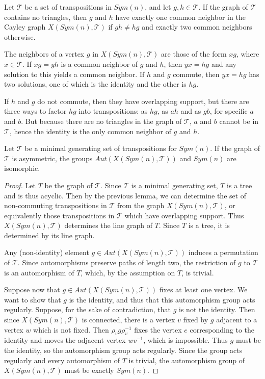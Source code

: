 \begin{lemma}
	Let $\mathcal{T}$ be a set of transpositions in $Sym(n)$, and let $g,h\in \mathcal{T}$.  If the graph of $\mathcal{T}$ contains no triangles, then $g$ and $h$ have exactly one common neighbor in the Cayley graph $X(Sym(n),\mathcal{T})$ if $gh\neq hg$ and exactly two common neighbors otherwise.
\end{lemma}
\begin{lemma}
	The neighbors of a vertex $g$ in $X(Sym(n),\mathcal{T})$ are those of the form $xg$, where $x\in \mathcal{T}$.  If $xg=yh$ is a common neighbor of $g$ and $h$, then $yx=hg$ and any solution to this yields a common neighbor.  If $h$ and $g$ commute, then $yx=hg$ has two solutions, one of which is the identity and the other is $hg$.
	
	If $h$ and $g$ do not commute, then they have overlapping support, but there are three ways to factor $hg$ into transpositions: as $hg$, as $ah$ and as $gb$, for specific $a$ and $b$.  But because there are no triangles in the graph of $\mathcal{T}$, $a$ and $b$ cannot be in $\mathcal{T}$, hence the identity is the only common neighbor of $g$ and $h$.
\end{lemma}



\begin{theorem}
	Let $\mathcal{T}$ be a minimal generating set of transpositions for $Sym(n)$.  If the graph of $\mathcal{T}$ is asymmetric, the groups $Aut(X(Sym(n),\mathcal{T}))$ and  $Sym(n)$ are isomorphic.
\end{theorem}

\begin{proof}
	Let $T$ be the graph of $\mathcal{T}$.  Since $\mathcal{T}$ is a minimal generating set, $T$ is a tree and is thus acyclic.  Then by the previous lemma, we can determine the set of non-commuting transpositions in $\mathcal{T}$ from the graph $X(Sym(n),\mathcal{T})$, or equivalently those transpositions in $\mathcal{T}$ which have overlapping support.  Thus $X(Sym(n),\mathcal{T})$ determines the line graph of $T$.  Since $T$ is a tree, it is determined by its line graph.
	
	Any (non-identity) element $g\in Aut(X(Sym(n),\mathcal{T}))$ induces a permutation of $\mathcal{T}$.  Since automorphisms preserve paths of length two, the restriction of $g$ to $\mathcal{T}$ is an automorphism of $T$, which, by the assumption on $T$, is trivial.
	
	Suppose now that $g\in Aut(X(Sym(n),\mathcal{T}))$ fixes at least one vertex.  We want to show that $g$ is the identity, and thus that this automorphism group acts regularly.  Suppose, for the sake of contradiction, that $g$ is not the identity.  Then since $X(Sym(n),\mathcal{T})$ is connected, there is a vertex $v$ fixed by $g$ adjacent to a vertex $w$ which is not fixed.  Then $\rho_vg\rho_v^{-1}$ fixes the vertex $e$ corresponding to the identity and moves the adjacent vertex $wv^{-1}$, which is impossible.  Thus $g$ must be the identity, so the automorphism group acts regularly.  Since the group acts regularly and every automorphism of $T$ is trivial, the automorphism group of $X(Sym(n),\mathcal{T})$ must be exactly $Sym(n)$.
\end{proof}

